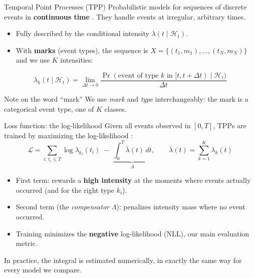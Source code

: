 \documentclass[aspectratio=169]{beamer}
\begin{document}
\begin{frame}{Temporal Point Processes (TPP)}
  Probabilistic models for sequences of discrete events in \textbf{continuous
  time} \cite{zuo2020transformer}. They handle events at irregular, arbitrary
  times.
  \vspace{0.3em}
  \begin{itemize}
    \item Fully described by the conditional intensity $\lambda(t \mid \mathcal{H}_t)$.
    \item With \textbf{marks} (event types), the sequence is
          $X = \{(t_1, m_1), \ldots, (t_N, m_N)\}$ and we use $K$ intensities:
  \end{itemize}
  \[
    \lambda_k(t \mid \mathcal{H}_t) = \lim_{\Delta t \to 0}
    \frac{\Pr(\text{event of type } k \text{ in } [t, t+\Delta t) \mid \mathcal{H}_t)}{\Delta t}
  \]
  \begin{block}{Note on the word ``mark''}
    We use \emph{mark} and \emph{type} interchangeably: the mark is a categorical
    event type, one of $K$ classes.
  \end{block}
\end{frame}

\begin{frame}{Loss function: the log-likelihood}
  Given all events observed in $[0,T]$, TPPs are trained by maximizing the
  log-likelihood \cite{mei2017neural}:
  \[
    \mathcal{L} = \sum_{i:\, t_i \leq T} \log \lambda_{k_i}(t_i)
      \;-\; \underbrace{\int_{0}^{T} \bar{\lambda}(t)\, dt}_{\Lambda},
    \qquad \bar{\lambda}(t) = \sum_{k=1}^{K} \lambda_k(t)
  \]
  \begin{itemize}
    \item First term: rewards a \textbf{high intensity} at the moments where
          events actually occurred (and for the right type $k_i$).
    \item Second term (the \emph{compensator} $\Lambda$): penalizes intensity mass
          where no event occurred.
    \item Training minimizes the \textbf{negative} log-likelihood (NLL), our main
          evaluation metric.
  \end{itemize}
  In practice, the integral is estimated numerically, in exactly the same way for
  every model we compare.
\end{frame}
\end{document}
